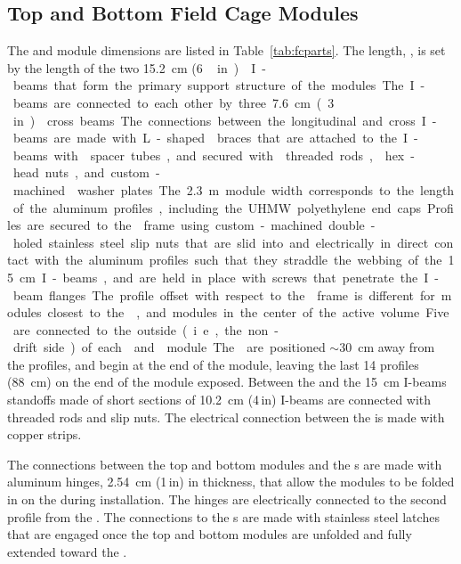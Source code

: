 \subsection{Top and Bottom Field Cage Modules}
\label{sec:fdsp-hv-des-fc-tbmods}

The  and  module dimensions are listed in Table~\ref{tab:fcparts}. The length, \spfcmodlen{}, is set by the length of the two \SI{15.2}{\cm} (\SI{6}\,in)  I-beams that form the primary support structure of the modules. The I-beams are connected to each other by three  \SI{7.6}{\cm} (\SI{3}\,in)  cross beams. The connections between the longitudinal and cross I-beams are made with L-shaped  braces that are attached to the I-beams with  spacer tubes, and secured with  threaded rods,  hex-head nuts, and custom-machined \frfour washer plates.

The \SI{2.3}{\m} module width corresponds to the length of the aluminum profiles, including the UHMW polyethylene end caps. Profiles are secured to the  frame using custom-machined double-holed stainless steel slip nuts that are slid into and electrically in direct contact with the aluminum profiles such that they straddle the webbing of the \SI{15}{\cm} I-beams, and are held in place with screws that penetrate the I-beam flanges. The profile offset with respect to the  frame is different for modules closest to the , %
and modules in the center of the active volume.

Five  are connected to the outside (i.e., the non-drift side) of each  and  module. The  are positioned $\sim$\SI{30}{\cm} away from the profiles, and begin at the  end of the module, leaving the last 14 profiles (\SI{88}{\cm}) on the  end of the module exposed. Between the  and the \SI{15}{\cm} I-beams standoffs made of short sections of \SI{10.2}{\cm} (4\,in)   I-beams are connected with  threaded rods and slip nuts. The electrical connection between the  is made with copper strips.

The connections between the top and bottom modules and the s are made with aluminum hinges, \SI{2.54}{\cm} (1\,in) in thickness, that allow the modules to be folded in on the  during installation. The hinges are electrically connected to the second profile from the . The connections to the s are made with stainless steel latches that are engaged once the top and bottom  modules are unfolded and fully extended toward the .

